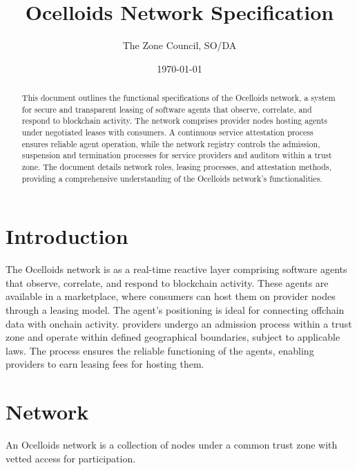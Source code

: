 \documentclass{oc}
\begin{document}
\title{Ocelloids Network Specification}
\author{The Zone Council, SO/DA}
\date{\today}
\maketitle


\begin{abstract}
This document outlines the functional specifications of the Ocelloids network, a system for secure and transparent leasing of software agents that observe, correlate, and respond to blockchain activity.
The network comprises provider nodes hosting agents under negotiated leases with consumers.
A continuous service attestation process ensures reliable agent operation, while the network registry controls the admission, suspension and termination processes for service providers and auditors within a trust zone.
The document details network roles, leasing processes, and attestation methods, providing a comprehensive understanding of the Ocelloids network's functionalities.
\end{abstract}


\newpage

\section{Introduction}\label{sec:introduction}

The Ocelloids network is as a real-time reactive layer comprising software \glspl*{agent} that observe, correlate, and respond to blockchain activity.
These \glspl*{agent} are available in a marketplace, where \glspl*{consumer} can host them on \gls*{provider} nodes through a leasing model.
The agent's positioning is ideal for connecting offchain data with onchain activity.
\Glspl*{provider} undergo an admission process within a trust zone and operate within defined geographical boundaries, subject to applicable laws.
The  process ensures the reliable functioning of the \glspl*{agent}, enabling \glspl*{provider} to earn leasing fees for hosting them.

\section{Network}

An Ocelloids network is a collection of nodes under a common trust zone with vetted access for participation.
\end{document}
